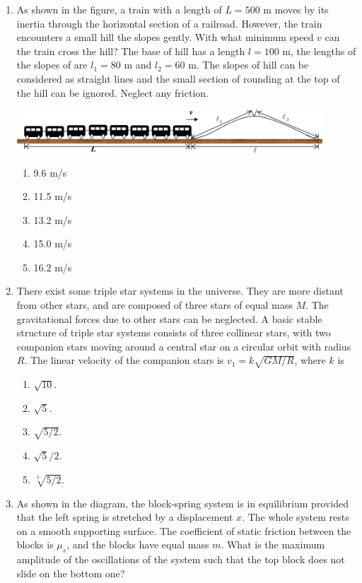 \documentclass[12pt,letterpaper]{article}
\begin{document}
\begin{enumerate}[resume]
\vfill
\newpage

\item
As shown in the figure, a train with a length of $L = 500$ m moves by its inertia through the horizontal section of a railroad. However, the train encounters a small hill the slopes gently. With what minimum speed $v$ can the train cross the hill? The base of hill has a length $l = 100$ m, the lengths of the slopes of are $l_1 = 80$ m and $l_2 = 60$ m. The slopes of hill can be considered as straight lines and the small section of rounding at the top of the hill can be ignored. Neglect any friction.

\includegraphics[width=0.9\textwidth]{train.png}
\begin{enumerate}
\item 9.6 m/s
\item 11.5 m/s
\item 13.2 m/s
\item 15.0 m/s
\item 16.2 m/s
\end{enumerate}

\item
There exist some triple star systems in the universe. They are more distant from other stars, and are composed of three stars of equal mass $M$. The gravitational forces due to other stars can be neglected. A basic stable structure of triple star systems consists of three collinear stars, with two companion stars moving around a central star on a circular orbit with radius $R$. The linear velocity of the companion stars is $v_1 = k\sqrt{GM/R}$, where $k$ is
\begin{enumerate}
\item $\sqrt{10}$.
\item $\sqrt{5}$.
\item $\sqrt{5/2}$.
\item $\sqrt{5}/2$.
\item $\sqrt[3]{5/2}$.
\end{enumerate}

\item
As shown in the diagram, the block-spring system is in equilibrium provided that the left spring is stretched by a displacement $x$. The whole system rests on a smooth supporting surface. The coefficient of static friction between the blocks is $\mu_s$, and the blocks have equal mass $m$. What is the maximum amplitude of the oscillations of the system such that the top block does not slide on the bottom one?


\end{enumerate}
\end{document}
